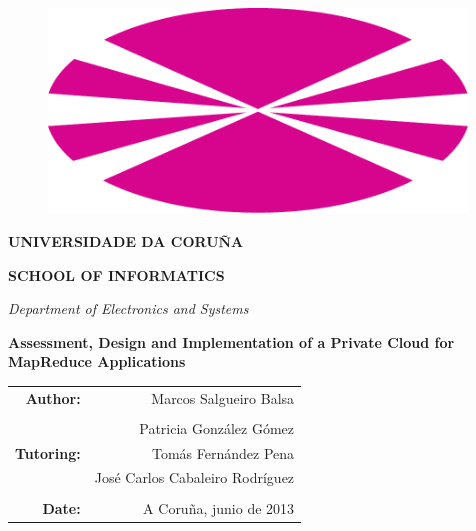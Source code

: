 \begin{titlepage}
\begin{changemargin}{-2.8cm}{0cm}
\begin{center}

\begin{figure}[tbp]
\hspace*{-1.5cm}
\includegraphics[width=0.99\textwidth]{imagenes/00.pdf}
\end{figure}

{\large \bf{UNIVERSIDADE DA CORU\~NA}}

{\large \bf{SCHOOL OF INFORMATICS}}

\vspace{0.25cm}

\emph{Department of Electronics and Systems}

\vspace{1.25cm}



{\huge \bf{Assessment, Design and Implementation of a Private Cloud for MapReduce Applications}}

\vspace{1.5cm}

\begin{flushright}
\begin{tabular}{r r@{}}
\textbf{Author:} & Marcos Salgueiro Balsa \\
& \\
& Patricia Gonz\'alez G\'omez \\
\textbf{Tutoring:} & Tom\'as Fern\'andez Pena \\
& Jos\'e Carlos Cabaleiro Rodr\'iguez \\
& \\
\textbf{Date:} & A Coru\~na, junio de 2013
\end{tabular}
\end{flushright}

\end{center}
\end{changemargin}
\end{titlepage}

